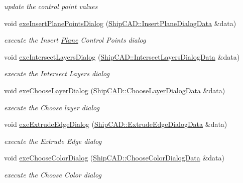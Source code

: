 \begin{DoxyCompactItemize}
\begin{DoxyCompactList}\small\item\em update the control point values \end{DoxyCompactList}\item 
void \hyperlink{classShipCAD_1_1Controller_aca4334441b3388052a1bd3ac5e8f6b22}{exe\+Insert\+Plane\+Points\+Dialog} (\hyperlink{structShipCAD_1_1InsertPlaneDialogData}{Ship\+C\+A\+D\+::\+Insert\+Plane\+Dialog\+Data} \&data)
\begin{DoxyCompactList}\small\item\em execute the Insert \hyperlink{classShipCAD_1_1Plane}{Plane} Control Points dialog \end{DoxyCompactList}\item 
void \hyperlink{classShipCAD_1_1Controller_aa33036772c52e52368b5cc4ebfbbe487}{exe\+Intersect\+Layers\+Dialog} (\hyperlink{structShipCAD_1_1IntersectLayersDialogData}{Ship\+C\+A\+D\+::\+Intersect\+Layers\+Dialog\+Data} \&data)
\begin{DoxyCompactList}\small\item\em execute the Intersect Layers dialog \end{DoxyCompactList}\item 
void \hyperlink{classShipCAD_1_1Controller_a0255f1b79a48aa8156e078bc7bcc8cf9}{exe\+Choose\+Layer\+Dialog} (\hyperlink{structShipCAD_1_1ChooseLayerDialogData}{Ship\+C\+A\+D\+::\+Choose\+Layer\+Dialog\+Data} \&data)
\begin{DoxyCompactList}\small\item\em execute the Choose layer dialog \end{DoxyCompactList}\item 
void \hyperlink{classShipCAD_1_1Controller_a993a7855df28b5b0e8ee0e49b94e49d7}{exe\+Extrude\+Edge\+Dialog} (\hyperlink{structShipCAD_1_1ExtrudeEdgeDialogData}{Ship\+C\+A\+D\+::\+Extrude\+Edge\+Dialog\+Data} \&data)
\begin{DoxyCompactList}\small\item\em execute the Extrude Edge dialog \end{DoxyCompactList}\item 
void \hyperlink{classShipCAD_1_1Controller_a56cdb705108804e8c8b723c343316280}{exe\+Choose\+Color\+Dialog} (\hyperlink{structShipCAD_1_1ChooseColorDialogData}{Ship\+C\+A\+D\+::\+Choose\+Color\+Dialog\+Data} \&data)
\begin{DoxyCompactList}\small\item\em execute the Choose Color dialog \end{DoxyCompactList}\item 

\end{DoxyCompactItemize}
